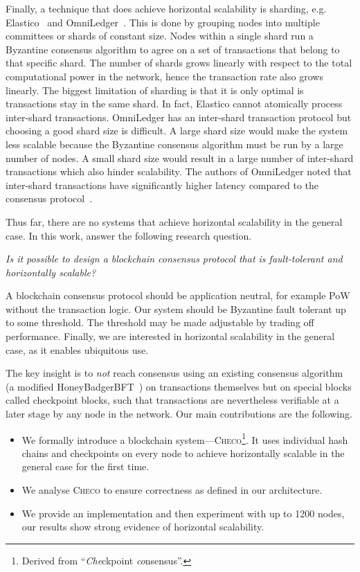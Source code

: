 Finally, a technique that does achieve horizontal scalability is sharding, e.g. Elastico~\cite{luu2016elastico} and OmniLedger~\cite{kokoris2017omniledger}.
This is done by grouping nodes into multiple committees or shards of constant size.
Nodes within a single shard run a Byzantine consensus algorithm to agree on a set of transactions that belong to that specific shard.
The number of shards grows linearly with respect to the total computational power in the network, hence the transaction rate also grows linearly.
The biggest limitation of sharding is that it is only optimal is transactions stay in the same shard.
In fact, Elastico cannot atomically process inter-shard transactions.
OmniLedger has an inter-shard transaction protocol but choosing a good shard size is difficult.
A large shard size would make the system less scalable because the Byzantine consensus algorithm must be run by a large number of nodes.
A small shard size would result in a large number of inter-shard transactions which also hinder scalability.
The authors of OmniLedger noted that inter-shard transactions have significantly higher latency compared to the consensus protocol~\cite{kokoris2017omniledger}.

Thus far, there are no systems that achieve horizontal scalability in the general case.
In this work, answer the following research question.
\begin{displayquote}
\emph{Is it possible to design a blockchain consensus protocol that is fault-tolerant and horizontally scalable?}
\end{displayquote}
A blockchain consensus protocol should be application neutral,
for example PoW without the transaction logic.
Our system should be Byzantine fault tolerant up to some threshold.
The threshold may be made adjustable by trading off performance.
Finally, we are interested in horizontal scalability in the general case, as it enables ubiquitous use.

The key insight is to \emph{not} reach consensus using an existing consensus algorithm (a modified HoneyBadgerBFT~\cite{miller2016honey}) on transactions themselves but on special blocks called checkpoint blocks,
such that transactions are nevertheless verifiable at a later stage by any node in the network.
Our main contributions are the following.
\begin{itemize}
    \item We formally introduce a blockchain system---\textsc{Checo}\footnote{Derived from ``\emph{Che}ckpoint \emph{co}nsensus''.}.
        It uses individual hash chains and checkpoints on every node to achieve
        horizontally scalable in the general case for the first time.
    \item We analyse \textsc{Checo} to ensure correctness as defined in our architecture.
    \item We provide an implementation and then experiment with up to 1200 nodes,
        our results show strong evidence of horizontal scalability.
\end{itemize}


